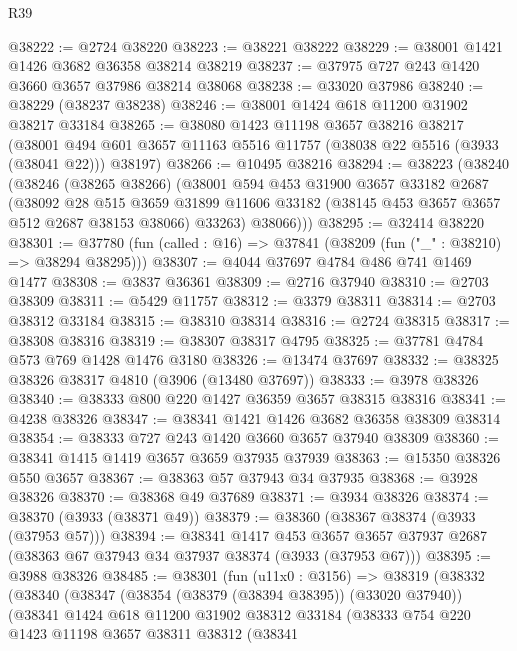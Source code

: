 \begin{lexlean}{R39}
\begin{coremodule}
@38222 := @2724 @38220
@38223 := @38221 @38222
@38229 := @38001 @1421 @1426 @3682 @36358 @38214 @38219
@38237 := @37975 @727 @243 @1420 @3660 @3657 @37986 @38214 @38068
@38238 := @33020 @37986
@38240 := @38229 (@38237 @38238)
@38246 := @38001 @1424 @618 @11200 @31902 @38217 @33184
@38265 := @38080
    @1423
    @11198
    @3657
    @38216
    @38217
    (@38001 @494 @601 @3657 @11163 @5516 @11757 (@38038 @22 @5516 (@3933 (@38041 @22))) @38197)
@38266 := @10495 @38216
@38294 := @38223
    (@38240
      (@38246
        (@38265 @38266)
        (@38001
          @594
          @453
          @31900
          @3657
          @33182
          @2687
          (@38092
            @28
            @515
            @3659
            @31899
            @11606
            @33182
            (@38145 @453 @3657 @3657 @512 @2687 @38153 @38066)
            @33263)
          @38066)))
@38295 := @32414 @38220
@38301 := @37780 (fun (called : @16) => @37841 (@38209 (fun ("_" : @38210) => @38294 @38295)))
@38307 := @4044 @37697 @4784 @486 @741 @1469 @1477
@38308 := @3837 @36361
@38309 := @2716 @37940
@38310 := @2703 @38309
@38311 := @5429 @11757
@38312 := @3379 @38311
@38314 := @2703 @38312 @33184
@38315 := @38310 @38314
@38316 := @2724 @38315
@38317 := @38308 @38316
@38319 := @38307 @38317 @4795
@38325 := @37781 @4784 @573 @769 @1428 @1476 @3180
@38326 := @13474 @37697
@38332 := @38325 @38326 @38317 @4810 (@3906 (@13480 @37697))
@38333 := @3978 @38326
@38340 := @38333 @800 @220 @1427 @36359 @3657 @38315 @38316
@38341 := @4238 @38326
@38347 := @38341 @1421 @1426 @3682 @36358 @38309 @38314
@38354 := @38333 @727 @243 @1420 @3660 @3657 @37940 @38309
@38360 := @38341 @1415 @1419 @3657 @3659 @37935 @37939
@38363 := @15350 @38326 @550 @3657
@38367 := @38363 @57 @37943 @34 @37935
@38368 := @3928 @38326
@38370 := @38368 @49 @37689
@38371 := @3934 @38326
@38374 := @38370 (@3933 (@38371 @49))
@38379 := @38360 (@38367 @38374 (@3933 (@37953 @57)))
@38394 := @38341
    @1417
    @453
    @3657
    @3657
    @37937
    @2687
    (@38363 @67 @37943 @34 @37937 @38374 (@3933 (@37953 @67)))
@38395 := @3988 @38326
@38485 := @38301
    (fun (u11x0 : @3156) =>
    @38319
      (@38332
        (@38340
          (@38347
            (@38354 (@38379 (@38394 @38395)) (@33020 @37940))
            (@38341
              @1424
              @618
              @11200
              @31902
              @38312
              @33184
              (@38333
                @754
                @220
                @1423
                @11198
                @3657
                @38311
                @38312
                (@38341

\end{coremodule}
\end{lexlean}
